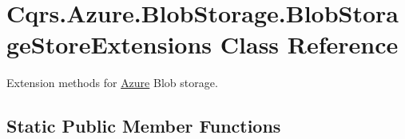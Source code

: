 \hypertarget{classCqrs_1_1Azure_1_1BlobStorage_1_1BlobStorageStoreExtensions}{}\section{Cqrs.\+Azure.\+Blob\+Storage.\+Blob\+Storage\+Store\+Extensions Class Reference}
\label{classCqrs_1_1Azure_1_1BlobStorage_1_1BlobStorageStoreExtensions}


Extension methods for \hyperlink{namespaceCqrs_1_1Azure}{Azure} Blob storage.  


\subsection*{Static Public Member Functions}
